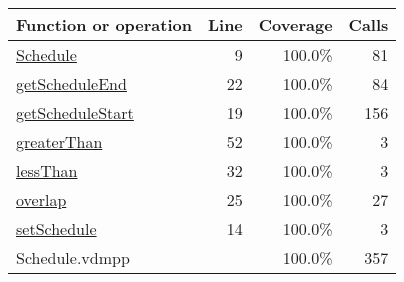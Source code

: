 \bigskip
\begin{longtable}{|l|r|r|r|}
\hline
Function or operation & Line & Coverage & Calls \\
\hline
\hline
\hyperref[Schedule:9]{Schedule} & 9&100.0\% & 81 \\
\hline
\hyperref[getScheduleEnd:22]{getScheduleEnd} & 22&100.0\% & 84 \\
\hline
\hyperref[getScheduleStart:19]{getScheduleStart} & 19&100.0\% & 156 \\
\hline
\hyperref[greaterThan:52]{greaterThan} & 52&100.0\% & 3 \\
\hline
\hyperref[lessThan:32]{lessThan} & 32&100.0\% & 3 \\
\hline
\hyperref[overlap:25]{overlap} & 25&100.0\% & 27 \\
\hline
\hyperref[setSchedule:14]{setSchedule} & 14&100.0\% & 3 \\
\hline
\hline
Schedule.vdmpp & & 100.0\% & 357 \\
\hline
\end{longtable}

